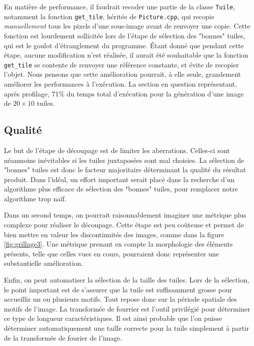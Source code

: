 \documentclass{article}
\begin{document}
En matière de performance, il faudrait recoder une partie de la classe \texttt{Tuile}, notamment la fonction \texttt{get\_tile}, héritée de \texttt{Picture.cpp}, qui recopie \emph{manuellement} tous les pixels d'une sous-image avant de renvoyer une copie. Cette fonction est lourdement sollicitée lors de l'étape de sélection des "bonnes" tuiles, qui est le goulot d'étranglement du programme. Étant donné que pendant cette étape, aucune modification n'est réalisée, il aurait été souhaitable que la fonction \texttt{get\_tile} se contente de renvoyer une référence constante, et évite de recopier l'objet. 
Nous pensons que cette amélioration pourrait, à elle seule, grandement améliorer les performances à l'exécution. La section en question représentant, après profilage, 71\% du temps total d'exécution pour la génération d'une image de $20\times10$ tuiles. 

\subsection{Qualité}
\label{sec:prop}

Le but de l'étape de découpage est de limiter les aberrations. Celles-ci sont néanmoins inévitables si les tuiles juxtaposées sont mal choisies. La sélection de "bonnes" tuiles est donc le facteur majoritaire déterminant la qualité du résultat produit. Dans l'idéal, un effort important serait placé dans la recherche d'un algorithme plus efficace de sélection des "bonnes" tuiles, pour remplacer notre algorithme trop naïf.

Dans un second temps, on pourrait raisonnablement imaginer une métrique plus complexe pour réaliser le découpage. Cette étape est peu coûteuse et permet de bien mettre en valeur les discontinuités des images, comme dans la figure \ref{fig:grillage3}. Une métrique prenant en compte la morphologie des éléments présents, telle que celles vues en cours, pourraient donc représenter une substantielle amélioration. 

Enfin, on peut automatiser la sélection de la taille des tuiles. Lors de la sélection, le point important est de s'assurer que la tuile est suffisamment grosse pour accueillir un ou plusieurs motifs. Tout repose donc sur la période spatiale des motifs de l'image. La transformée de fourrier est l'outil privilégié pour déterminer ce type de longueur caractéristiques. Il est ainsi probable que l'on puisse déterminer automatiquement une taille correcte pour la tuile simplement à partir de la transformée de fourier de l'image. 
\end{document}
